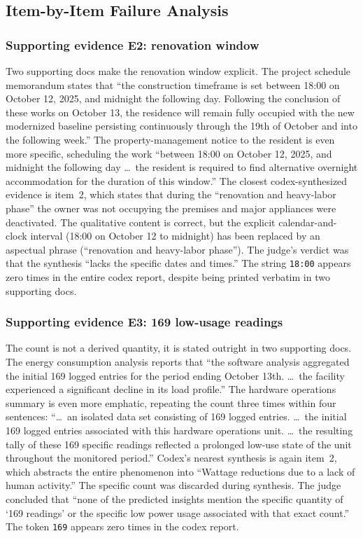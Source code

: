 \documentclass[]{servicenow}
\begin{document}
\subsection{Item-by-Item Failure Analysis}
\label{appx:task216:per_item}

\subsubsection*{Supporting evidence E2: renovation window}

Two supporting docs make the renovation window explicit. The project schedule memorandum states that ``the construction timeframe is set between 18:00 on October 12, 2025, and midnight the following day. Following the conclusion of these works on October 13, the residence will remain fully occupied with the new modernized baseline persisting continuously through the 19th of October and into the following week.'' The property-management notice to the resident is even more specific, scheduling the work ``between 18:00 on October 12, 2025, and midnight the following day \dots\ the resident is required to find alternative overnight accommodation for the duration of this window.'' The closest codex-synthesized evidence is item~2, which states that during the ``renovation and heavy-labor phase'' the owner was not occupying the premises and major appliances were deactivated. The qualitative content is correct, but the explicit calendar-and-clock interval (18:00 on October 12 to midnight) has been replaced by an aspectual phrase (``renovation and heavy-labor phase''). The judge's verdict was that the synthesis ``lacks the specific dates and times.'' The string \texttt{18:00} appears zero times in the entire codex report, despite being printed verbatim in two supporting docs.

\subsubsection*{Supporting evidence E3: 169 low-usage readings}

The count is not a derived quantity, it is stated outright in two supporting docs. The energy consumption analysis reports that ``the software analysis aggregated the initial 169 logged entries for the period ending October 13th. \dots\ the facility experienced a significant decline in its load profile.'' The hardware operations summary is even more emphatic, repeating the count three times within four sentences: ``\dots\ an isolated data set consisting of 169 logged entries. \dots\ the initial 169 logged entries associated with this hardware operations unit. \dots\ the resulting tally of these 169 specific readings reflected a prolonged low-use state of the unit throughout the monitored period.'' Codex's nearest synthesis is again item~2, which abstracts the entire phenomenon into ``Wattage reductions due to a lack of human activity.'' The specific count was discarded during synthesis. The judge concluded that ``none of the predicted insights mention the specific quantity of `169 readings' or the specific low power usage associated with that exact count.'' The token \texttt{169} appears zero times in the codex report.
\end{document}
